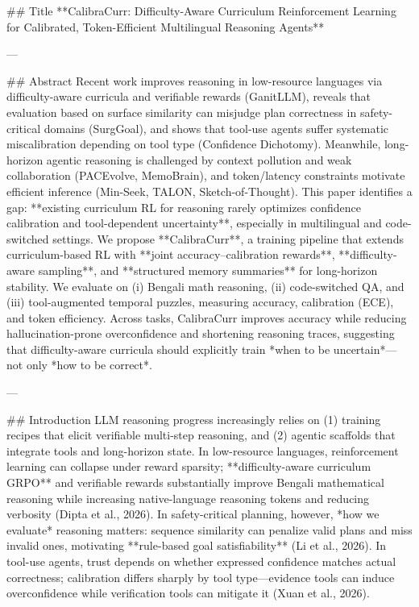 ## Title  
**CalibraCurr: Difficulty-Aware Curriculum Reinforcement Learning for Calibrated, Token-Efficient Multilingual Reasoning Agents**

---

## Abstract  
Recent work improves reasoning in low-resource languages via difficulty-aware curricula and verifiable rewards (GanitLLM), reveals that evaluation based on surface similarity can misjudge plan correctness in safety-critical domains (SurgGoal), and shows that tool-use agents suffer systematic miscalibration depending on tool type (Confidence Dichotomy). Meanwhile, long-horizon agentic reasoning is challenged by context pollution and weak collaboration (PACEvolve, MemoBrain), and token/latency constraints motivate efficient inference (Min-Seek, TALON, Sketch-of-Thought). This paper identifies a gap: **existing curriculum RL for reasoning rarely optimizes confidence calibration and tool-dependent uncertainty**, especially in multilingual and code-switched settings. We propose **CalibraCurr**, a training pipeline that extends curriculum-based RL with **joint accuracy–calibration rewards**, **difficulty-aware sampling**, and **structured memory summaries** for long-horizon stability. We evaluate on (i) Bengali math reasoning, (ii) code-switched QA, and (iii) tool-augmented temporal puzzles, measuring accuracy, calibration (ECE), and token efficiency. Across tasks, CalibraCurr improves accuracy while reducing hallucination-prone overconfidence and shortening reasoning traces, suggesting that difficulty-aware curricula should explicitly train *when to be uncertain*—not only *how to be correct*.

---

## Introduction  
LLM reasoning progress increasingly relies on (1) training recipes that elicit verifiable multi-step reasoning, and (2) agentic scaffolds that integrate tools and long-horizon state. In low-resource languages, reinforcement learning can collapse under reward sparsity; **difficulty-aware curriculum GRPO** and verifiable rewards substantially improve Bengali mathematical reasoning while increasing native-language reasoning tokens and reducing verbosity (Dipta et al., 2026). In safety-critical planning, however, *how we evaluate* reasoning matters: sequence similarity can penalize valid plans and miss invalid ones, motivating **rule-based goal satisfiability** (Li et al., 2026). In tool-use agents, trust depends on whether expressed confidence matches actual correctness; calibration differs sharply by tool type—evidence tools can induce overconfidence while verification tools can mitigate it (Xuan et al., 2026).

